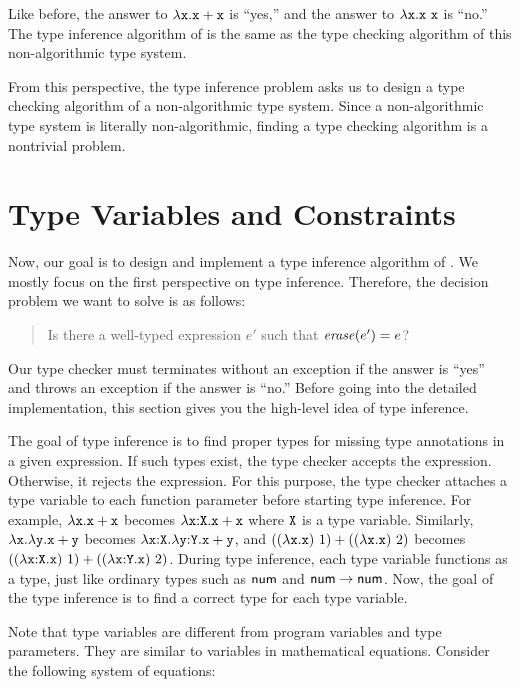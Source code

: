 Like before, the answer to $\lambda\texttt{x}.\texttt{x}+\texttt{x}$ is ``yes,'' and the
answer to $\lambda\texttt{x}.\texttt{x}\ \texttt{x}$ is ``no.'' The type inference algorithm
of \lang is the same as the type checking algorithm of this non-algorithmic type
system.

From this perspective, the type inference problem asks us to design a type
checking algorithm of a non-algorithmic type system. Since a non-algorithmic
type system is literally non-algorithmic, finding a type checking algorithm is
a nontrivial problem.

\section{Type Variables and Constraints}

Now, our goal is to design and implement a type inference algorithm of
\lang. We mostly focus on the first perspective on type inference. Therefore,
the decision problem we want to solve is as follows:

\begin{quote}
  \hspace{-1em}Is there a well-typed \plang expression $e'$ such that $\mbox{\emph{erase}}(e')=e$?
\end{quote}

Our type checker must terminates without an exception if the answer is ``yes''
and throws an exception if the answer is ``no.'' Before going into the detailed
implementation, this section gives you the high-level idea of type inference.

The goal of type inference is to find proper types for missing type annotations
in a given expression. If such types exist, the type checker accepts the
expression. Otherwise, it rejects the expression.  For this purpose, the type
checker attaches a type variable to each function parameter before starting type
inference. For example, $\lambda\texttt{x}.\texttt{x}+\texttt{x}$ becomes
$\lambda\texttt{x}{:}\texttt{X}.\texttt{x}+\texttt{x}$ where $\texttt{X}$ is a type variable. Similarly,
$\lambda\texttt{x}.\lambda\texttt{y}.\texttt{x}+\texttt{y}$ becomes
$\lambda\texttt{x}{:}\texttt{X}.\lambda\texttt{y}{:}\texttt{Y}.\texttt{x}+\texttt{y}$, and
$((\lambda\texttt{x}.\texttt{x})\ 1)+((\lambda\texttt{x}.\texttt{x})\ 2)$ becomes
$((\lambda\texttt{x}{:}\texttt{X}.\texttt{x})\ 1)+((\lambda\texttt{x}{:}\texttt{Y}.\texttt{x})\ 2)$.
During type inference, each type variable functions as a type, just like
ordinary types such as $\textsf{num}$ and $\textsf{num}\rightarrow\textsf{num}$. Now, the goal of the
type inference is to find a correct type for each type variable.

Note that type variables are different from program variables and type
parameters. They are similar to variables in mathematical equations. Consider
the following system of equations:


